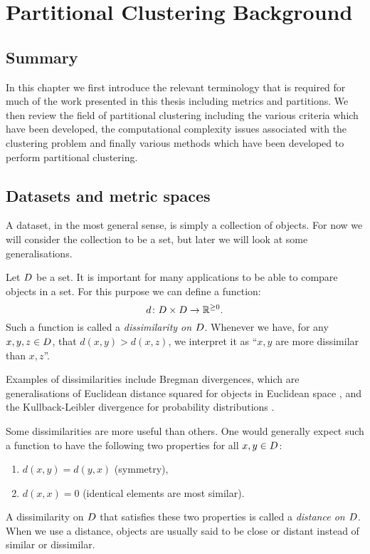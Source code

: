 \chapter{Partitional Clustering Background}
\label{cha:background}

\section{Summary}
\label{sec:summary-backgd}

In this chapter we first introduce the relevant terminology that is required
for much of the work presented in this thesis including metrics and
partitions.  We then review the field of partitional clustering including the
various criteria which have been developed, the computational complexity
issues associated with the clustering problem and finally various methods
which have been developed to perform partitional clustering.

\section{Datasets and metric spaces}
\label{sec:datas-metr-spac}

A dataset, in the most general sense, is simply a collection of objects.  For
now we will consider the collection to be a set, but later we will look at
some generalisations.

Let $D$ be a set.  It is important for many applications to be able to
compare objects in a set.  For this purpose we can define a function:
\begin{equation*}
  d \colon D \times D \to \mathbb{R}^{\geq 0}.
\end{equation*}
Such a function is called a \textit{dissimilarity on $D$}.  Whenever we
have, for any $x,y,z \in D$, that $d(x,y)>d(x,z)$, we interpret it as
``$x,y$ are more dissimilar than $x,z$''.

Examples of dissimilarities include Bregman divergences, which are
generalisations of Euclidean distance squared for objects in Euclidean space
\citep{banerjee2005clustering}, and the Kullback-Leibler divergence for
probability distributions \citep{kullback68information}.

Some dissimilarities are more useful than others.  One would generally expect
such a function to have the following two properties for all $x,y \in D$:
\begin{enumerate}
\item $d(x,y) = d(y,x)$ \quad (symmetry),
\item \label{item:distinct} $d(x,x) = 0$ \quad (identical elements are most
  similar).
\end{enumerate}
A dissimilarity on $D$ that satisfies these two properties is called a
\textit{distance on $D$}.  When we use a distance, objects are usually
said to be close or distant instead of similar or dissimilar.

